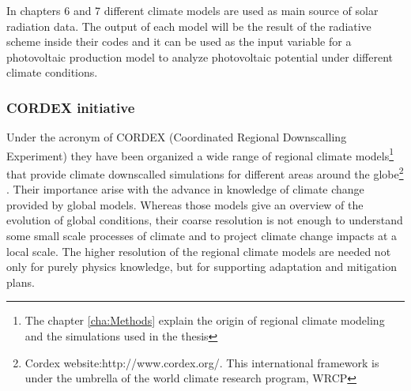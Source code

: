 



In chapters 6 and 7 different climate models are used as main source of solar radiation data. The output of each model will be the result of the radiative scheme inside their codes and it can be used as the input variable for a photovoltaic production model to analyze photovoltaic potential under different climate conditions.

\subsubsection{CORDEX initiative}

Under the acronym of CORDEX (Coordinated Regional Downscalling Experiment) they have been organized a wide range of regional climate models\footnote{The chapter \ref{cha:Methods} explain the origin of regional climate modeling and the simulations used in the thesis} that provide climate downscalled simulations for different areas around the globe\footnote{Cordex website:http://www.cordex.org/. This international framework is under the umbrella of the world climate research program, WRCP} . Their importance arise with the advance in knowledge of climate change provided by global models. Whereas those models give an overview of the evolution of global conditions, their coarse resolution is not enough to understand some small scale processes of climate and to project climate change impacts at a local scale. The higher resolution of the regional climate models are needed not only for purely physics knowledge, but for supporting adaptation and mitigation plans.

